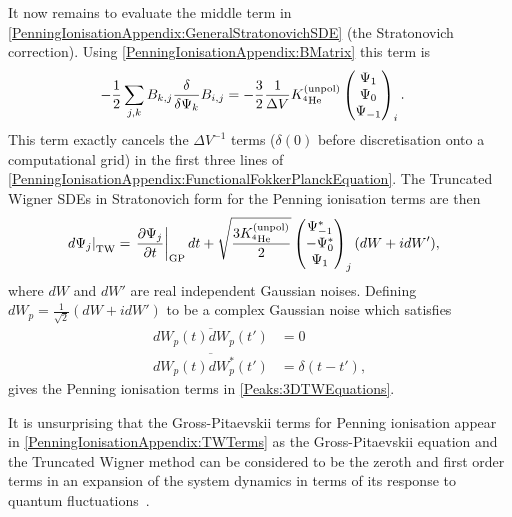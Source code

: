 It now remains to evaluate the middle term in \eqref{PenningIonisationAppendix:GeneralStratonovichSDE} (the Stratonovich correction). Using \eqref{PenningIonisationAppendix:BMatrix} this term is
\begin{align}
    - \frac{1}{2} \sum_{j, k} B_{k, j} \frac{\delta }{\delta \Psi_k}B_{i,j} &= - \frac{3}{2} \frac{1}{\Delta V} K^\text{(unpol)}_{^4\text{He}} 
    \begin{pmatrix}
        \Psi_1 \\
        \Psi_0 \\
        \Psi_{-1}
    \end{pmatrix}_i.
\end{align}
This term exactly cancels the $\Delta V^{-1}$ terms ($\delta(0)$ before discretisation onto a computational grid) in the first three lines of \eqref{PenningIonisationAppendix:FunctionalFokkerPlanckEquation}. The Truncated Wigner SDEs in Stratonovich form for the Penning ionisation terms are then
\begin{align}
    \left. d \Psi_j\right|_\text{TW} &= \left. \frac{\partial \Psi_j}{\partial t}\right|_\text{GP} dt + \sqrt{\frac{3 \Kunpol}{2}} 
    \begin{pmatrix}
        \Psi_{-1}^*\\
        -\Psi_{0}^*\\
        \Psi_{1}
    \end{pmatrix}_j (d W + i dW'),
    \label{PenningIonisationAppendix:TWTerms}
\end{align}
where $dW$ and $dW'$ are real independent Gaussian noises. Defining $ dW_p = \frac{1}{\sqrt{2}}\left(dW + i dW' \right)$ to be a complex Gaussian noise which satisfies
\begin{align}
    \overline{dW_p(t) dW_p(t')} &= 0 \\
    \overline{dW_p(t) dW_p^*(t')} &= \delta(t-t'),
\end{align}
gives the Penning ionisation terms in \eqref{Peaks:3DTWEquations}.

It is unsurprising that the Gross-Pitaevskii terms for Penning ionisation appear in \eqref{PenningIonisationAppendix:TWTerms} as the Gross-Pitaevskii equation and the Truncated Wigner method can be considered to be the zeroth and first order terms in an expansion of the system dynamics in terms of its response to quantum fluctuations~\citep{Polkovnikov:2003}.